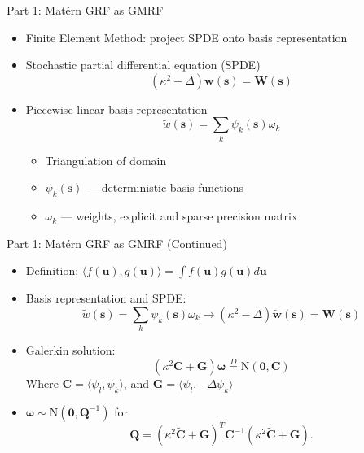 \documentclass{beamer}
\begin{document}
\begin{frame}{Part 1: Mat\'ern GRF as GMRF \citep{Lindgren2011}}

\begin{itemize}
\addtolength{\itemsep}{0.5\baselineskip}
\item Finite Element Method: project SPDE onto basis representation
\item Stochastic partial differential equation (SPDE)
$$ (\kappa^{2} - \Delta)\pmb{w}(\pmb{s}) = \pmb{W}(\pmb{s})$$
\item Piecewise linear basis representation
$$ \widetilde{w}(\pmb{s}) = \sum_{k} \psi_{k}(\pmb{s})\omega_{k}$$
        \begin{itemize}
        \addtolength{\itemsep}{0.5\baselineskip}
        \item Triangulation of domain
        \item $\psi_{k}(\pmb{s})$ --- deterministic basis functions
        \item $\omega_{k}$ --- weights, explicit and sparse precision matrix
        \end{itemize}
\end{itemize}

\end{frame}

\begin{frame}{Part 1: Mat\'ern GRF as GMRF \citep{Lindgren2011}}{(Continued)}

\begin{itemize}
\addtolength{\itemsep}{0.5\baselineskip}
\item Definition: $\langle f(\pmb{u}), g(\pmb{u}) \rangle = \int f(\pmb{u}) g(\pmb{u}) d\pmb{u}$

\item Basis representation and SPDE:
$$ \widetilde{w}(\pmb{s}) = \sum_{k} \psi_{k}(\pmb{s})\omega_{k} \longrightarrow (\kappa^{2} - \Delta)\widetilde{\pmb{w}}(\pmb{s}) = \pmb{W}(\pmb{s})  $$
\item Galerkin solution:
$$ \left(
\kappa^{2} \pmb{C} + \pmb{G} \right) \pmb{\omega} \overset{D}{=} \text{N}(\pmb{0},\pmb{C})$$
Where $\pmb{C} = \langle \psi_{l}, \psi_{k} \rangle$, and $ \pmb{G} = \langle \psi_{l}, - \Delta \psi_{k} \rangle$
\item $\pmb{\omega} \sim \text{N}(\pmb{0}, \pmb{Q}^{-1})$ for 
$$\pmb{Q} = \left( \kappa^{2} \widetilde{\pmb{C}} + \pmb{G} \right)^{T} \pmb{C}^{-1} \left( \kappa^{2} \widetilde{\pmb{C}} + \pmb{G} \right).$$
\end{itemize}

\end{frame}
\end{document}
